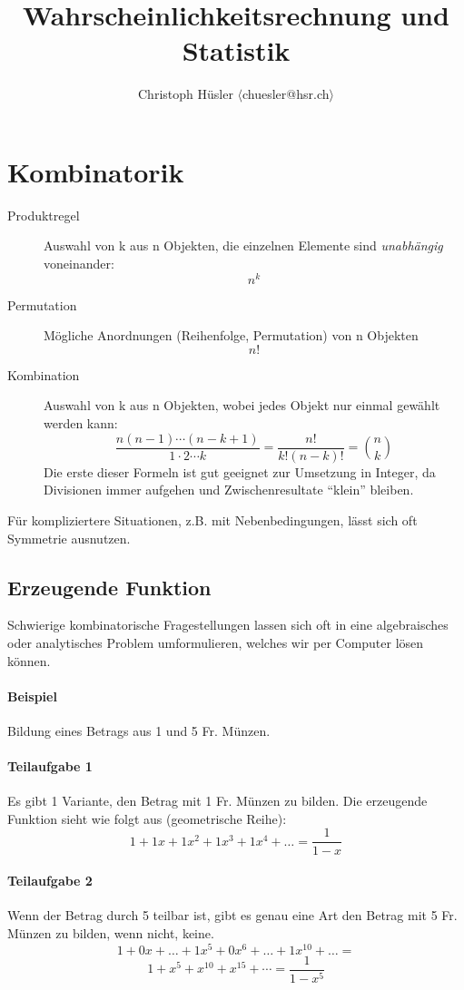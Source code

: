 \documentclass[10pt,a4paper]{scrartcl}
\title{Wahrscheinlichkeitsrechnung und Statistik}
\author{Christoph H\"usler $\langle$chuesler@hsr.ch$\rangle$ }
\begin{document}
\maketitle
\section{Kombinatorik}
\begin{description}
\item[Produktregel] Auswahl von k aus n Objekten, die einzelnen Elemente sind \emph{unabhängig} voneinander: $$n^k$$
\item[Permutation] Mögliche Anordnungen (Reihenfolge, Permutation) von n Objekten $$n!$$
\item[Kombination] Auswahl von k aus n Objekten, wobei jedes Objekt nur einmal gewählt werden kann:
    $$\frac{n(n-1)\cdots(n-k+1)}{1 \cdot 2 \cdots k} = \frac{n!}{k!(n-k)!} = \binom{n}{k}$$
    Die erste dieser Formeln ist gut geeignet zur Umsetzung in Integer, da Divisionen immer aufgehen und Zwischenresultate ``klein'' bleiben.
\end{description}

Für kompliziertere Situationen, z.B. mit Nebenbedingungen, lässt sich oft Symmetrie ausnutzen.

\subsection{Erzeugende Funktion}
Schwierige kombinatorische Fragestellungen lassen sich oft in eine algebraisches oder analytisches Problem umformulieren, welches wir per Computer lösen können.

\paragraph{Beispiel} Bildung eines Betrags aus 1 und 5 Fr. Münzen.
\paragraph{Teilaufgabe 1} Es gibt 1 Variante, den Betrag mit 1 Fr. Münzen zu bilden.
Die erzeugende Funktion sieht wie folgt aus (geometrische Reihe): $$1 + 1x + 1x^2 + 1x^3 + 1x^4 + \dots = \frac{1}{1-x}$$ 

\paragraph{Teilaufgabe 2} Wenn der Betrag durch 5 teilbar ist, gibt es genau eine Art den Betrag mit 5 Fr. Münzen zu bilden, wenn nicht, keine.
$$1 + 0x + \dots + 1x^5 + 0x^6 + \dots + 1x^{10} + \dots = $$ $$1 + x^5 + x^{10} + x^{15} + \cdots = \frac{1}{1-x^5}$$
\end{document}

